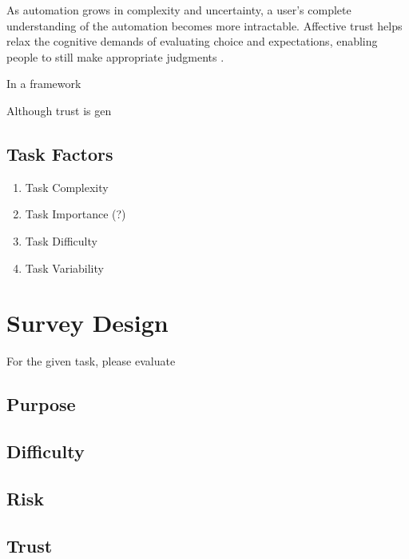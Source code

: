 \documentclass[letterpaper]{article} %
\begin{document}
As automation grows in complexity and uncertainty, a user's complete understanding of the automation becomes more intractable. Affective trust helps relax the cognitive demands of evaluating choice and expectations, enabling people to still make appropriate judgments \cite{lee}. 

In a framework 

Although trust is gen

\subsection{Task Factors}
\begin{enumerate}
    \item Task Complexity
    \item Task Importance (?)
    \item Task Difficulty
    \item Task Variability
\end{enumerate}


\section{Survey Design}
For the given task, please evaluate 
\subsection{Purpose}
\subsection{Difficulty}
\subsection{Risk}
\subsection{Trust}
\end{document}
